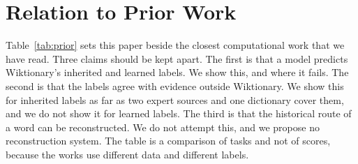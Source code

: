 \documentclass[11pt]{article}
\begin{document}
\section{Relation to Prior Work}
\label{app:prior}

Table~\ref{tab:prior} sets this paper beside the closest computational work that we have read. Three claims should be kept apart. The first is that a model predicts Wiktionary's inherited and learned labels. We show this, and where it fails. The second is that the labels agree with evidence outside Wiktionary. We show this for inherited labels as far as two expert sources and one dictionary cover them, and we do not show it for learned labels. The third is that the historical route of a word can be reconstructed. We do not attempt this, and we propose no reconstruction system. The table is a comparison of tasks and not of scores, because the works use different data and different labels.
\end{document}
